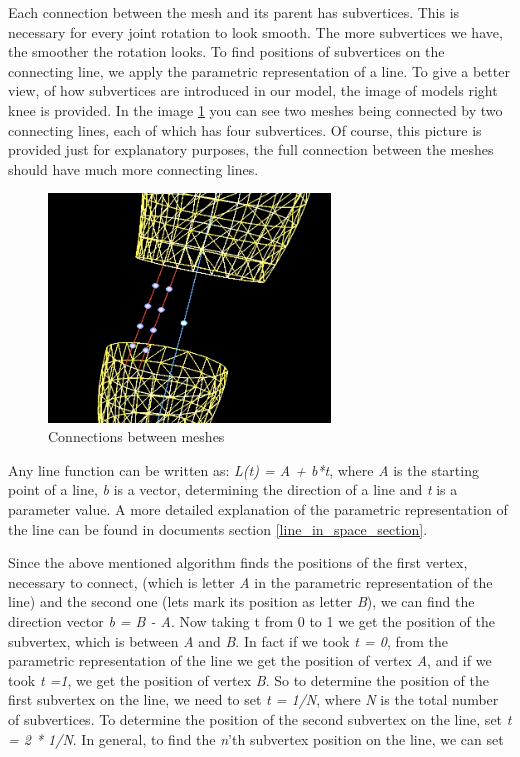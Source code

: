 \documentclass[times, 10pt,twocolumn]{article}
\begin{document}
Each connection between the mesh and its parent has subvertices. This is necessary for every joint rotation to look smooth. The more subvertices we have, the smoother the rotation looks. To find positions of subvertices on the connecting line, we apply the parametric representation of a line. To give a better view, of how subvertices are introduced in our model, the image of models right knee is provided. In the image \ref{our_mesh_connection} you can see two meshes being connected by two connecting lines, each of which has four subvertices. Of course, this picture is provided just for explanatory purposes, the full connection between the meshes should have much more connecting lines.

\begin{figure}[H]
  \caption{Connections between meshes}
  \label{our_mesh_connection}
  \centering
  \includegraphics[width=75mm]{images/mesh_connection.jpg}
\end{figure}

Any line function can be written as: \emph{L(t) = A + b*t}, where \emph{A} is the starting point of a line, \emph{b} is a vector, determining the direction of a line and \emph{t} is a parameter value. A more detailed explanation of the parametric representation of the line can be found in documents section \ref{line_in_space_section}.

Since the above mentioned algorithm finds the positions of the first vertex, necessary to connect, (which is letter \emph{A} in the parametric representation of the line) and the second one (lets mark its position as letter \emph{B}), we can find the direction vector \emph{b = B - A}. Now taking t from 0 to 1 we get the position of the subvertex, which is between \emph{A} and \emph{B}. In fact if we took \emph{t = 0}, from the parametric representation of the line we get the position of vertex \emph{A}, and if we took \emph{t =1}, we get the position of vertex \emph{B}. So to determine the position of the first subvertex on the line, we need to set \emph{t = 1/N}, where \emph{N} is the total number of subvertices. To determine the position of the second subvertex on the line, set \emph{t = 2 * 1/N}. In general, to find the \emph{n}'th subvertex position on the line, we can set
\end{document}
